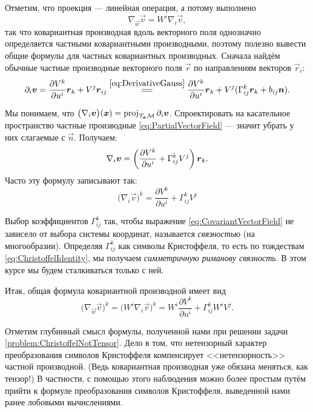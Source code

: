 Отметим, что проекция --- линейная операция, а потому выполнено
\[
	\nabla_{\vec{w}}\vec{v} = W^i\nabla_i\vec{v},
\]
так что ковариантная производная вдоль векторного поля однозначно определяется частными ковариантными производными, поэтому полезно вывести общие формулы для частных ковариантных производных. Сначала найдём обычные частные производные векторного поля $\vec{r}$ по направлениям векторов $\vec{r}_i$:
\begin{equation} \label{eq:PartialVectorField}
	\partial_i\vec{v} = \frac{\partial V^k}{\partial u^i}\vec{r}_k + V^j\vec{r}_{ij} \stackrel{\eqref{eq:DerivativeGauss}}{=\joinrel=} \frac{\partial V^k}{\partial u^i}\vec{r}_k + V^j(\Gamma_{ij}^k\vec{r}_k + b_{ij}\vec{n}).
\end{equation}

Мы понимаем, что $\big(\nabla_i\boldsymbol{v}\big)(\boldsymbol{x}) = \operatorname{proj}_{\mathcal{T}_{\boldsymbol{x}}\mathcal{M}}\partial_i\boldsymbol{v}$. Спроектировать на касательное пространство частные производные \eqref{eq:PartialVectorField} --- значит убрать у них слагаемые с $\vec{n}$. Получаем:
\[
	\nabla_i\boldsymbol{v} = \left(\frac{\partial V^k}{\partial u^i} + \Gamma_{ij}^kV^j\right)\boldsymbol{r}_k.
\]
Часто эту формулу записывают так:
\begin{equation} \label{eq:CovariantVectorField}
	\big(\nabla_i\vec{v}\big)^k = \frac{\partial V^k}{\partial u^i} + \Gamma_{ij}^kV^j
\end{equation}

Выбор коэффициентов $\Gamma_{ij}^k$ так, чтобы выражение \eqref{eq:CovariantVectorField} не зависело от выбора системы координат, называется \textit{связностью} (на многообразии). Определяя $\Gamma_{ij}^k$ как символы Кристоффеля, то есть по тождествам \eqref{eq:ChristoffelIdentity}, мы получаем \textit{симметричную риманову связность}. В этом курсе мы будем сталкиваться только с ней.

Итак, общая формула ковариантной производной имеет вид
\begin{equation} \label{eq:CovariantFormula}
	\big(\nabla_{\vec{w}}\vec{v}\big)^k = \big(W^i\nabla_i\vec{v}\big)^k = W^i\frac{\partial V^k}{\partial u^i} + \Gamma_{ij}^kW^iV^j.
\end{equation}

Отметим глубинный смысл формулы, полученной нами при решении задачи \ref{problem:ChristoffelNotTensor}. Дело в том, что нетензорный характер преобразования символов Кристоффеля компенсирует <<нетензорность>> частной производной. (Ведь ковариантная производная уже обязана меняться, как тензор!) В частности, с помощью этого наблюдения можно более простым путём прийти к формуле преобразования символов Кристоффеля, выведенной нами ранее лобовыми вычислениями.

